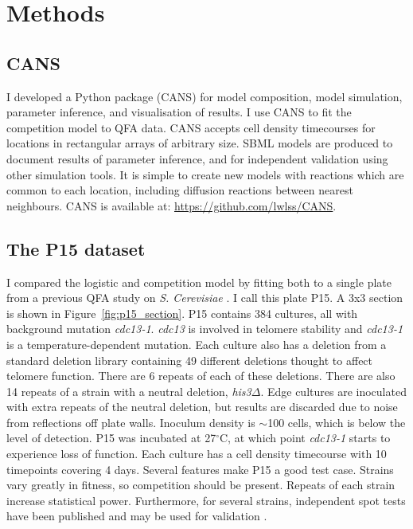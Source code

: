 \graphicspath{{images/}}

\section{Methods}
\label{sec:methods}

\subsection{CANS}

I developed a Python package (CANS) for model composition, model
simulation, parameter inference, and visualisation of results. I use
CANS to fit the competition model to QFA data. CANS accepts cell
density timecourses for locations in rectangular arrays of arbitrary
size. SBML models are produced to document results of parameter
inference, and for independent validation using other simulation
tools. It is simple to create new models with reactions which are
common to each location, including diffusion reactions between nearest
neighbours. CANS is available at:
\href{https://github.com/lwlss/CANS}{https://github.com/lwlss/CANS}.


\subsection{The P15 dataset}
\label{sec:P15_description}

I compared the logistic and competition model by fitting both to a
single plate from a previous QFA study on \textit{S. Cerevisiae}
\citep{Addinall2011}. I call this plate P15. A 3x3 section is shown in
Figure~\ref{fig:p15_section}. P15 contains 384 cultures, all with
background mutation \textit{cdc13-1}. \textit{cdc13} is involved in
telomere stability and \textit{cdc13-1} is a temperature-dependent
mutation. Each culture also has a deletion from a standard deletion
library containing 49 different deletions thought to affect telomere
function. There are 6 repeats of each of these deletions. There are
also 14 repeats of a strain with a neutral deletion,
\textit{his3}\(\Delta\). Edge cultures are inoculated with extra
repeats of the neutral deletion, but results are discarded due to
noise from reflections off plate walls. Inoculum density is
\(\sim\)100 cells, which is below the level of detection. P15 was
incubated at 27\(^{\circ}\)C, at which point \textit{cdc13-1} starts
to experience loss of function. Each culture has a cell density
timecourse with 10 timepoints covering 4 days. Several features make
P15 a good test case. Strains vary greatly in fitness, so competition
should be present. Repeats of each strain increase statistical
power. Furthermore, for several strains, independent spot tests have
been published and may be used for validation
\citep{maringele2002exo1,zubko2004exo1,Holstein20141259,foster2006mrx}.

